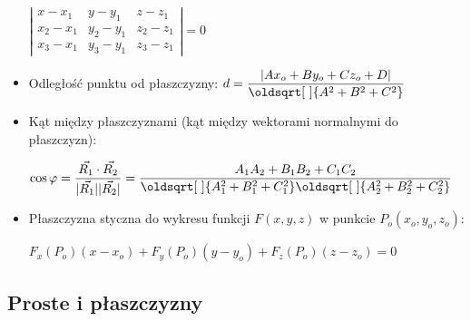 \documentclass[10pt, twoside, fleqn]{article}
\renewcommand*{\sqrt}[2][\ ]{\oldsqrt[#1]{#2}}
\begin{document}
\begin{itemize}
			\hspace{100pt}
			  $ \left| 
				\begin{array}{ccc}
					x-x_1 & y-y_1 & z-z_1 \\
					x_2-x_1 & y_2-y_1 & z_2-z_1 \\
					x_3-x_1 & y_3-y_1 & z_3-z_1 
				\end{array}
			   \right| = 0 $

\vspace{10pt}
\item Odległość punktu od płaszczyzny: \hspace{10pt}
			$ d = \dfrac{| Ax_o + By_o + Cz_o + D |}
						{\sqrt{A^2 + B^2 + C^2}} $

\vspace{10pt}						
\item Kąt między płaszczyznami 
	 (kąt między wektorami normalnymi do płaszczyzn):
	 		
	 		\hspace{100pt}
	 			$ \cos{\varphi} = 
	 			    \dfrac{\vec{R_1} \cdot \vec{R_2} }
	 			  		  {|\vec{R_1}| |\vec{R_2}|} 	  = 
	 			  	\dfrac{A_1 A_2 + B_1 B_2 + C_1 C_2}
	 			  		  { \sqrt{A_1^2 + B_1^2 + C_1^2}
	 			  		  	\sqrt{A_2^2 + B_2^2 + C_2^2} }$

\vspace{10pt}
\item Płaszczyzna styczna do wykresu funkcji $F(x,y,z)$ 
	  w punkcie $P_o(x_o,y_o,z_o)$: 
	  
	  		\hspace{100pt}
	  			$ F_x(P_o)(x-x_o) + 
	  			  F_y(P_o)(y-y_o) + 
	  			  F_z(P_o)(z-z_o) = 0 $

\end{itemize}


\vspace{35pt}
\subsection{Proste i płaszczyzny}
\end{document}
